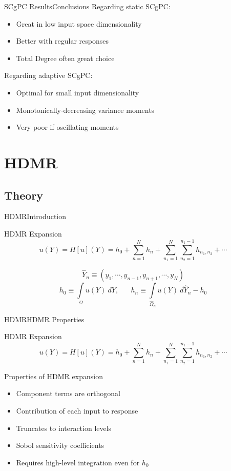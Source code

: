 \documentclass{beamer}
\begin{document}
\begin{frame}{SCgPC Results}{Conclusions}\vspace{-20pt}
  \vfill
Regarding static SCgPC:
\begin{itemize}
  \item Great in low input space dimensionality
  \item Better with regular responses
  \item Total Degree often great choice
\end{itemize}
  \vfill
Regarding adaptive SCgPC:
\begin{itemize}
  \item Optimal for small input dimensionality
  \item Monotonically-decreasing variance moments
  \item Very poor if oscillating moments
\end{itemize}
  \vfill
\end{frame}

\section{HDMR}
\subsection{Theory}
\begin{frame}{HDMR}{Introduction}%
  \begin{block}{HDMR Expansion}
    \[u(Y) = H[u](Y) = h_0 + \sum_{n=1}^N h_n + \sum_{n_1=1}^N\sum_{n_2=1}^{n_1-1} h_{n_1,n_2}+\cdots\]
  \end{block}
  \[\hat Y_n \equiv (y_1,\cdots,y_{n-1},y_{n+1},\cdots,y_N)\]
  \[h_0 \equiv \int\limits_\Omega u(Y)\ dY, \hspace{20pt} h_n \equiv \int\limits_{\hat\Omega_n} u(Y)\ d\hat Y_n - h_0\]
\end{frame}

\begin{frame}{HDMR}{HDMR Properties}%
  \begin{block}{HDMR Expansion}
    \[u(Y) = H[u](Y) = h_0 + \sum_{n=1}^N h_n + \sum_{n_1=1}^N\sum_{n_2=1}^{n_1-1} h_{n_1,n_2}+\cdots\]
  \end{block}
  Properties of HDMR expansion
  \begin{itemize}
    \item Component terms are orthogonal
    \item Contribution of each input to response
    \item Truncates to interaction levels
    \item Sobol sensitivity coefficients
    \item Requires high-level integration even for $h_0$
  \end{itemize}
  \vfill
\end{frame}
\end{document}
